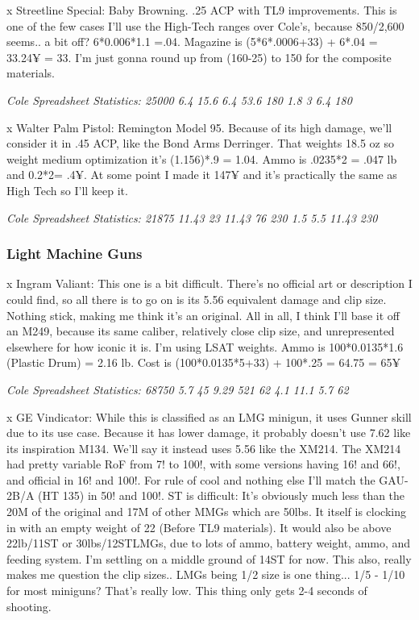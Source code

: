 \begin{multicols*}{2}
	x Streetline Special: Baby Browning. .25 ACP with TL9 improvements. This is one of the few cases I'll use the High-Tech ranges over Cole's, because 850/2,600 seems.. a bit off? 6*0.006*1.1 =.04. Magazine is (5*6*.0006+33) + 6*.04 = 33.24¥ = 33. I'm just gonna round up from (160-25) to 150 for the composite materials.
	
	\textit{\textcolor{OliveGreen}{Cole Spreadsheet Statistics: 25000 6.4 15.6 6.4 53.6 180 1.8 3 6.4 180}}
	
	x Walter Palm Pistol: Remington Model 95. Because of its high damage, we'll consider it in .45 ACP, like the Bond Arms Derringer. That weights 18.5 oz so weight medium optimization it's (1.156)*.9 = 1.04. Ammo is .0235*2 = .047 lb and 0.2*2= .4¥. At some point I made it 147¥ and it's practically the same as High Tech so I'll keep it.
	
	\textit{\textcolor{OliveGreen}{Cole Spreadsheet Statistics: 21875 11.43 23 11.43 76 230 1.5 5.5 11.43 230}}
	
	\subsubsection{Light Machine Guns}
	
	x Ingram Valiant: This one is a bit difficult. There's no official art or description I could find, so all there is to go on is its 5.56 equivalent damage and clip size. Nothing stick, making me think it's an original. All in all, I think I'll base it off an M249, because its same caliber, relatively close clip size, and unrepresented elsewhere for how iconic it is. I'm using LSAT weights. Ammo is 100*0.0135*1.6 (Plastic Drum) = 2.16 lb. Cost is (100*0.0135*5+33) + 100*.25 = 64.75 = 65¥
	
	\textit{\textcolor{OliveGreen}{Cole Spreadsheet Statistics: 68750 5.7 45 9.29 521 62 4.1 11.1 5.7 62}}
	
	x GE Vindicator: While this is classified as an LMG minigun, it uses Gunner skill due to its use case. Because it has lower damage, it probably doesn't use 7.62 like its inspiration M134. We'll say it instead uses 5.56 like the XM214. The XM214 had pretty variable RoF from 7! to 100!, with some versions having 16! and 66!, and official in 16! and 100!. For rule of cool and nothing else I'll match the GAU-2B/A (HT 135) in 50! and 100!. ST is difficult: It's obviously much less than the 20M of the original and 17M of other MMGs which are 50lbs. It itself is clocking in with an empty weight of 22 (Before TL9 materials). It would also be above 22lb/11ST  or 30lbs/12STLMGs, due to lots of ammo, battery weight, ammo, and feeding system. I'm settling on a middle ground of 14ST for now. This also, really makes me question the clip sizes.. LMGs being 1/2 size is one thing... 1/5 - 1/10 for most miniguns? That's really low. This thing only gets 2-4 seconds of shooting.
	

\end{multicols*}
